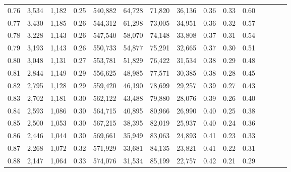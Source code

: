 \begin{tabular}{rrrcrrrrrrrrrrr}
0.76 &   3,534 &   1,182 &                                       0.25 &  540,882 &   64,728 &   71,820 &   36,136 &  0.36 &  0.33 &                         0.60 \\
0.77 &   3,430 &   1,185 &                                       0.26 &  544,312 &   61,298 &   73,005 &   34,951 &  0.36 &  0.32 &                         0.57 \\
0.78 &   3,228 &   1,143 &                                       0.26 &  547,540 &   58,070 &   74,148 &   33,808 &  0.37 &  0.31 &                         0.54 \\
0.79 &   3,193 &   1,143 &                                       0.26 &  550,733 &   54,877 &   75,291 &   32,665 &  0.37 &  0.30 &                         0.51 \\
0.80 &   3,048 &   1,131 &                                       0.27 &  553,781 &   51,829 &   76,422 &   31,534 &  0.38 &  0.29 &                         0.48 \\
0.81 &   2,844 &   1,149 &                                       0.29 &  556,625 &   48,985 &   77,571 &   30,385 &  0.38 &  0.28 &                         0.45 \\
0.82 &   2,795 &   1,128 &                                       0.29 &  559,420 &   46,190 &   78,699 &   29,257 &  0.39 &  0.27 &                         0.43 \\
0.83 &   2,702 &   1,181 &                                       0.30 &  562,122 &   43,488 &   79,880 &   28,076 &  0.39 &  0.26 &                         0.40 \\
0.84 &   2,593 &   1,086 &                                       0.30 &  564,715 &   40,895 &   80,966 &   26,990 &  0.40 &  0.25 &                         0.38 \\
0.85 &   2,500 &   1,053 &                                       0.30 &  567,215 &   38,395 &   82,019 &   25,937 &  0.40 &  0.24 &                         0.36 \\
0.86 &   2,446 &   1,044 &                                       0.30 &  569,661 &   35,949 &   83,063 &   24,893 &  0.41 &  0.23 &                         0.33 \\
0.87 &   2,268 &   1,072 &                                       0.32 &  571,929 &   33,681 &   84,135 &   23,821 &  0.41 &  0.22 &                         0.31 \\
0.88 &   2,147 &   1,064 &                                       0.33 &  574,076 &   31,534 &   85,199 &   22,757 &  0.42 &  0.21 &                         0.29 \\

\end{tabular}
